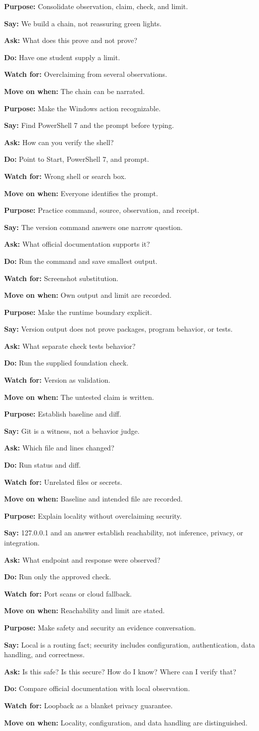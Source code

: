 \documentclass[11pt]{article}
\newcommand{\field}[2]{\textbf{\color{blue}#1:} #2\par}
\begin{document}
\field{Purpose}{Consolidate observation, claim, check, and limit.}\field{Say}{We build a chain, not reassuring green lights.}\field{Ask}{What does this prove and not prove?}\field{Do}{Have one student supply a limit.}\field{Watch for}{Overclaiming from several observations.}\field{Move on when}{The chain can be narrated.}
\field{Purpose}{Make the Windows action recognizable.}\field{Say}{Find PowerShell 7 and the prompt before typing.}\field{Ask}{How can you verify the shell?}\field{Do}{Point to Start, PowerShell 7, and prompt.}\field{Watch for}{Wrong shell or search box.}\field{Move on when}{Everyone identifies the prompt.}
\field{Purpose}{Practice command, source, observation, and receipt.}\field{Say}{The version command answers one narrow question.}\field{Ask}{What official documentation supports it?}\field{Do}{Run the command and save smallest output.}\field{Watch for}{Screenshot substitution.}\field{Move on when}{Own output and limit are recorded.}
\field{Purpose}{Make the runtime boundary explicit.}\field{Say}{Version output does not prove packages, program behavior, or tests.}\field{Ask}{What separate check tests behavior?}\field{Do}{Run the supplied foundation check.}\field{Watch for}{Version as validation.}\field{Move on when}{The untested claim is written.}
\field{Purpose}{Establish baseline and diff.}\field{Say}{Git is a witness, not a behavior judge.}\field{Ask}{Which file and lines changed?}\field{Do}{Run status and diff.}\field{Watch for}{Unrelated files or secrets.}\field{Move on when}{Baseline and intended file are recorded.}
\field{Purpose}{Explain locality without overclaiming security.}\field{Say}{127.0.0.1 and an answer establish reachability, not inference, privacy, or integration.}\field{Ask}{What endpoint and response were observed?}\field{Do}{Run only the approved check.}\field{Watch for}{Port scans or cloud fallback.}\field{Move on when}{Reachability and limit are stated.}
\field{Purpose}{Make safety and security an evidence conversation.}\field{Say}{Local is a routing fact; security includes configuration, authentication, data handling, and correctness.}\field{Ask}{Is this safe? Is this secure? How do I know? Where can I verify that?}\field{Do}{Compare official documentation with local observation.}\field{Watch for}{Loopback as a blanket privacy guarantee.}\field{Move on when}{Locality, configuration, and data handling are distinguished.}
\end{document}
